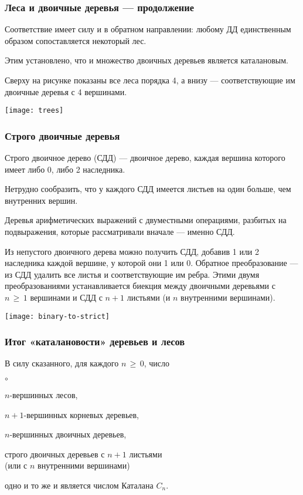 \documentclass[mathserif]{beamer}
\newenvironment{items}[1][\labelitemi]{\begin{list}{#1}{\setlength{\topsep}{0pt}\setlength{\partopsep}{0pt}\setlength{\parsep}{0pt}\setlength{\itemsep}{\parskip}}}{\end{list}}
\begin{document}
\begin{frame}[fragile]%
\frametitle{Леса и двоичные деревья — продолжение}
Соответствие имеет силу и в обратном направлении: любому ДД единственным образом сопоставляется некоторый лес.

\medskip

Этим установлено, что и множество двоичных деревьев является каталановым.

\medskip

Сверху на рисунке показаны все леса порядка 4, а внизу — соответствующие им двоичные деревья с 4 вершинами.

\bigskip
\medskip

\centerline{\texttt{[image: trees]}}
\end{frame}

\begin{frame}[fragile]%
\frametitle{Строго двоичные деревья}
Строго двоичное дерево (СДД) — двоичное дерево, каждая вершина которого имеет либо 0, либо 2 наследника.

\medskip

Нетрудно сообразить, что у каждого СДД имеется листьев на один больше, чем внутренних вершин.

\medskip

Деревья арифметических выражений с двуместными операциями, разбитых на подвыражения, которые рассматривали вначале — именно СДД.

\medskip

\begin{minipage}{.66\textwidth}
\small
Из непустого двоичного дерева можно получить СДД, добавив 1 или 2 наследника каждой вершине, у которой они 1 или 0.
Обратное преобразование — из СДД удалить все листья и соответствующие им ребра.
Этими двумя преобразованиями устанавливается биекция между двоичными деревьями с $n\,{\ge}\,1$ вершинами и СДД с $n{+}1$ листьями (и $n$ внутренними вершинами).

\end{minipage}\hfill%
\begin{minipage}{.30\textwidth}
\centerline{\texttt{[image: binary-to-strict]}}
\end{minipage}
\end{frame}

\begin{frame}[fragile]%
\frametitle{Итог «каталановости» деревьев и лесов}
В силу сказанного, для каждого $n\,{\ge}\,0$, число
\begin{items}[$\circ$]
\item $n$-вершинных лесов,
\item $n{+}1$-вершинных корневых деревьев,
\item $n$-вершинных двоичных деревьев,
\item строго двоичных деревьев с $n{+}1$ листьями \\
      (или с $n$ внутренними вершинами)
\end{items}
одно и то же и является числом Каталана $C_n$.
\end{frame}
\end{document}
